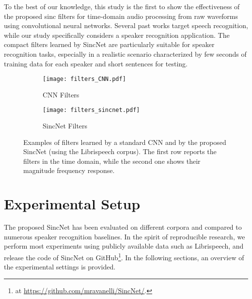 \documentclass{article}
\begin{document}
To the best of our knowledge,  this study is the first to show the effectiveness of the proposed sinc filters for time-domain audio processing from raw waveforms using convolutional neural networks. Several past works target speech recognition, while  our study specifically considers a speaker recognition application. The compact filters learned by SincNet are particularly suitable for speaker recognition tasks, especially in a realistic scenario characterized by few seconds of training data for each speaker and short sentences for testing.


\begin{figure*}[t!]
\begin{subfigure}{0.50\textwidth}
\texttt{[image: filters\_CNN.pdf]}
\caption{CNN Filters}
\label{fig:cnn_filt}
\end{subfigure} \hspace{0.0\textwidth}
\begin{subfigure}{0.50\textwidth}
\texttt{[image: filters\_sincnet.pdf]}
\caption{SincNet Filters}
\label{fig:sinc_filt}
\end{subfigure}
\caption{Examples of filters learned by a standard CNN and by the proposed SincNet (using the Librispeech corpus). The first row reports the filters in the time domain, while the second one shows their magnitude frequency response.}
\label{fig:ir}
\end{figure*}

\section{Experimental Setup}
The proposed SincNet has been evaluated on different corpora and compared to numerous speaker recognition baselines. %
In the spirit of reproducible research, we perform most experiments using publicly available data such as Librispeech, and release the code of SincNet on GitHub\footnote{\label{foot:code} at \url{https://github.com/mravanelli/SincNet/}.}. In the following sections, an overview of the experimental settings is provided.
\label{sec:setup}
\end{document}
